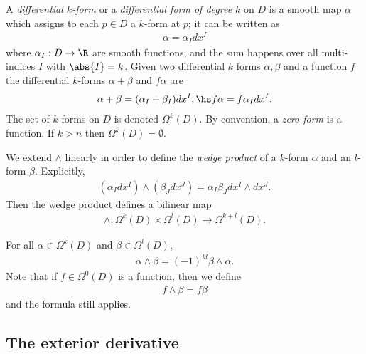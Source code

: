 \documentclass{article}
\begin{document}
\begin{definition}
    A \emph{differential $k$-form} or a \emph{differential form of degree $k$} on $D$ is a
    smooth map $\alpha$ which assigns to each $p\in D$ a $k$-form at $p$; it can be written as
    \begin{align*}
        \alpha=\alpha_Idx^I
    \end{align*}
    where $\alpha_I:D\to\R$ are smooth functions, and the sum happens over all multi-indices
    $I$ with $\abs{I}=k$. Given two differential $k$ forms $\alpha,\beta$ and a function $f$ 
    the differential $k$-forms $\alpha+\beta$ and $f\alpha$ are 
    \begin{align*}
        \alpha + \beta = (\alpha_I + \beta_I)dx^I, \hs f\alpha = f\alpha_I dx^I.
    \end{align*}
    The set of $k$-forms on $D$ is denoted $\Omega^k(D)$. By convention, a \emph{zero-form}
    is a function. If $k>n$ then $\Omega^k(D)=\emptyset$.
\end{definition}

\begin{definition}
    We extend $\wedge$ linearly in order to define the \emph{wedge product} of a $k$-form $\alpha$
    and an $l$-form $\beta$. Explicitly,
    \begin{align*}
        (\alpha_Idx^I) \wedge (\beta_Jdx^J) = \alpha_I\beta_Jdx^I\wedge dx^J.
    \end{align*}
    Then the wedge product defines a bilinear map 
    \begin{align*}
        \wedge : \Omega^k(D) \times \Omega^l(D) \to \Omega^{k+l} (D).
    \end{align*}
\end{definition}

\begin{proposition}
    For all $\alpha\in\Omega^k(D)$ and $\beta\in\Omega^l(D)$,
    \begin{align*}
        \alpha\wedge\beta = (-1)^{kl} \beta \wedge \alpha.
    \end{align*}
    Note that if $f\in\Omega^0(D)$ is a function, then we define 
    \begin{align*}
        f\wedge\beta = f\beta
    \end{align*}
    and the formula still applies.
\end{proposition}

\subsection{The exterior derivative}
\end{document}
